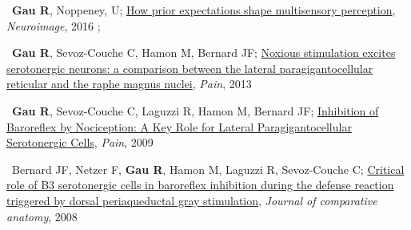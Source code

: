 \textbullet~\textbf{Gau R}, Noppeney, U; 
\href{https://osf.io/8frkq/}{How prior expectations shape multisensory perception}, 
\textit{Neuroimage}, 
2016
\newline
{}; 

\textbullet~\textbf{Gau R}, Sevoz-Couche C, Hamon M, Bernard JF; 
\href{https://osf.io/ktcv9/}{Noxious stimulation excites serotonergic neurons: a comparison between the lateral paragigantocellular reticular and the raphe magnus nuclei}, 
\textit{Pain}, 
2013
\newline
{}

\textbullet~\textbf{Gau R}, Sevoz-Couche C, Laguzzi R, Hamon M, Bernard JF; 
\href{https://osf.io/cqhvb/}{Inhibition of Baroreflex by Nociception: A Key Role for Lateral Paragigantocellular Serotonergic Cells}, 
\textit{Pain}, 
2009
\newline
{}

\textbullet~Bernard JF, Netzer F, \textbf{Gau R}, Hamon M, Laguzzi R, Sevoz-Couche C; 
\href{https://osf.io/rcvuj/}{Critical role of B3 serotonergic cells in baroreflex inhibition during the defense reaction triggered by dorsal periaqueductal gray stimulation}, 
\textit{Journal of comparative anatomy}, 
2008
\newline
{}
